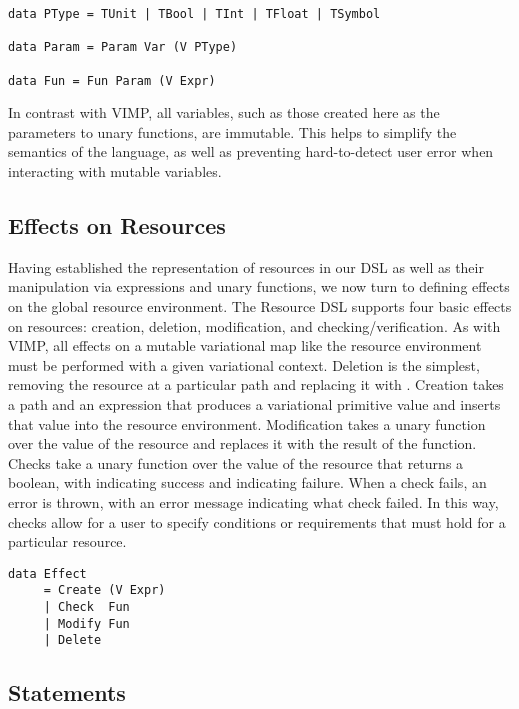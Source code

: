 \documentclass[12pt,oneside]{book}
\begin{document}
\begin{lstlisting}
data PType = TUnit | TBool | TInt | TFloat | TSymbol

data Param = Param Var (V PType)

data Fun = Fun Param (V Expr)
\end{lstlisting}

In contrast with VIMP, all variables, such as those created here as the parameters to unary functions, are immutable. This helps to simplify the semantics of the language, as well as preventing
hard-to-detect user error when interacting with mutable variables.

\subsection{Effects on Resources}

Having established the representation of resources in our DSL as well as their manipulation via expressions and unary functions,
we now turn to defining effects on the global resource environment.
The Resource DSL supports four basic effects on resources: creation, deletion, modification, and checking/verification. As with VIMP,
all effects on a mutable variational map like the resource environment must be performed with a given variational context. Deletion is the
simplest, removing the resource at a particular path and replacing it with . Creation takes a path and an expression that produces a variational primitive value
and inserts that value into the resource environment. Modification takes a unary function over the value of the resource and replaces it
with the result of the function. Checks take a unary function over the value of the resource that returns a boolean, with  indicating
success and  indicating failure. When a check fails, an error is thrown, with an error message indicating what check failed.
In this way, checks allow for a user to specify conditions or requirements that must hold for a particular resource.

\begin{minipage}{\linewidth}
\begin{lstlisting}
data Effect
     = Create (V Expr)
     | Check  Fun
     | Modify Fun
     | Delete
\end{lstlisting}
\end{minipage}

\subsection{Statements}
\end{document}
